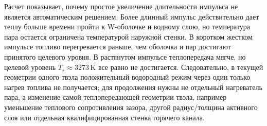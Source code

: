 Расчет показывает, почему простое увеличение длительности импульса не является автоматическим решением. Более длинный импульс действительно дает теплу больше времени пройти к W-оболочке и водному слою, но температура пара остается ограничена температурой наружной стенки. В коротком жестком импульсе топливо перегревается раньше, чем оболочка и пар достигают принятого целевого уровня. В растянутом импульсе теплопередача мягче, но целевой уровень \(T_s\approx3273\,\mathrm{K}\) все равно не достигается. Следовательно, в текущей геометрии одного твэла положительный водородный режим через один только нагрев топлива не получается; для продолжения нужны не отдельный нагреватель пара, а изменение самой теплопередающей геометрии твэла, например уменьшение теплового сопротивления зазора, другой радиус/толщина активного слоя или отдельная квалифицированная стенка горячего канала.
